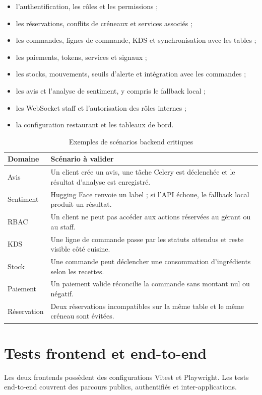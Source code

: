 \begin{itemize}
  \item l'authentification, les rôles et les permissions ;
  \item les réservations, conflits de créneaux et services associés ;
  \item les commandes, lignes de commande, KDS et synchronisation avec les tables ;
  \item les paiements, tokens, services et signaux ;
  \item les stocks, mouvements, seuils d'alerte et intégration avec les commandes ;
  \item les avis et l'analyse de sentiment, y compris le fallback local ;
  \item les WebSocket staff et l'autorisation des rôles internes ;
  \item la configuration restaurant et les tableaux de bord.
\end{itemize}

\begin{table}[H]
\centering
\caption{Exemples de scénarios backend critiques}
\label{tab:tests-backend}
\begin{tabularx}{\textwidth}{p{3.4cm}Y}
\toprule
\textbf{Domaine} & \textbf{Scénario à valider} \\
\midrule
Avis & Un client crée un avis, une tâche Celery est déclenchée et le résultat d'analyse est enregistré. \\
Sentiment & Hugging Face renvoie un label ; si l'API échoue, le fallback local produit un résultat. \\
RBAC & Un client ne peut pas accéder aux actions réservées au gérant ou au staff. \\
KDS & Une ligne de commande passe par les statuts attendus et reste visible côté cuisine. \\
Stock & Une commande peut déclencher une consommation d'ingrédients selon les recettes. \\
Paiement & Un paiement valide réconcilie la commande sans montant nul ou négatif. \\
Réservation & Deux réservations incompatibles sur la même table et le même créneau sont évitées. \\
\bottomrule
\end{tabularx}
\end{table}

\section{Tests frontend et end-to-end}
Les deux frontends possèdent des configurations Vitest et Playwright. Les tests end-to-end couvrent des parcours publics, authentifiés et inter-applications.

